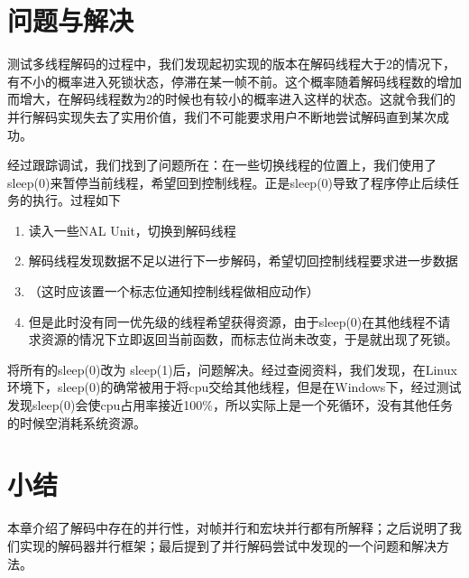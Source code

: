 \section{问题与解决}
\label{sec:parallelbuganddebug}

测试多线程解码的过程中，我们发现起初实现的版本在解码线程大于2的情况下，有不小的概率进入死锁状态，停滞在某一帧不前。这个概率随着解码线程数的增加而增大，在解码线程数为2的时候也有较小的概率进入这样的状态。这就令我们的并行解码实现失去了实用价值，我们不可能要求用户不断地尝试解码直到某次成功。

经过跟踪调试，我们找到了问题所在：在一些切换线程的位置上，我们使用了sleep(0)来暂停当前线程，希望回到控制线程。正是sleep(0)导致了程序停止后续任务的执行。过程如下
\begin{enumerate}
\item 读入一些NAL Unit，切换到解码线程
\item 解码线程发现数据不足以进行下一步解码，希望切回控制线程要求进一步数据
\item （这时应该置一个标志位通知控制线程做相应动作）
\item 但是此时没有同一优先级的线程希望获得资源，由于sleep(0)在其他线程不请求资源的情况下立即返回当前函数，而标志位尚未改变，于是就出现了死锁。
\end{enumerate}

将所有的sleep(0)改为 sleep(1)后，问题解决。经过查阅资料，我们发现，在Linux环境下，sleep(0)的确常被用于将cpu交给其他线程，但是在Windows下，经过测试发现sleep(0)会使cpu占用率接近100\%，所以实际上是一个死循环，没有其他任务的时候空消耗系统资源。

\section{小结}
\label{sec:sum5}

本章介绍了解码中存在的并行性，对帧并行和宏块并行都有所解释；之后说明了我们实现的解码器并行框架；最后提到了并行解码尝试中发现的一个问题和解决方法。
